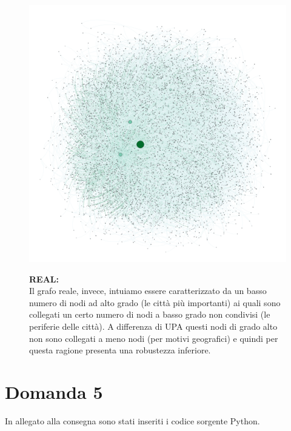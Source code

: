\documentclass{article}
\begin{document}
\begin{figure}[H]
	\begin{minipage}{0.5\linewidth}
		\centering
		\includegraphics[width=0.9\linewidth, valign=t]{figures/real}
	\end{minipage}
	\begin{minipage}{0.55\linewidth}
		\textbf{REAL:}\\
		Il grafo reale, invece, intuiamo essere caratterizzato da un basso numero di nodi ad alto grado (le città più importanti) ai quali sono collegati un certo numero di nodi a basso grado non condivisi (le periferie delle città). A differenza di UPA questi nodi di grado alto non sono collegati a meno nodi (per motivi geografici) e quindi per questa ragione presenta una robustezza inferiore.\\
	\end{minipage}
\end{figure}

\section*{Domanda 5}
In allegato alla consegna sono stati inseriti i codice sorgente Python.
\end{document}

